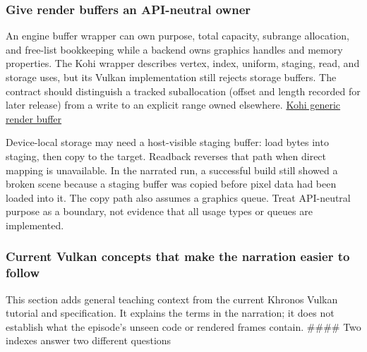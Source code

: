 \subsubsection{Give render buffers an API-neutral owner}\label{06-engine-ii-ch025-give-render-buffers-an-api-neutral-owner}

\hypertarget{06-engine-ii-ch025-give-render-buffers-an-api-neutral-owner}{}

An engine buffer wrapper can own purpose, total capacity, subrange allocation, and free-list bookkeeping while a backend owns graphics handles and memory properties. The Kohi wrapper describes vertex, index, uniform, staging, read, and storage uses, but its Vulkan implementation still rejects storage buffers. The contract should distinguish a tracked suballocation (offset and length recorded for later release) from a write to an explicit range owned elsewhere. \href{https://www.youtube.com/watch?v=7mNgC7dGkZs}{Kohi generic render buffer}

Device-local storage may need a host-visible staging buffer: load bytes into staging, then copy to the target. Readback reverses that path when direct mapping is unavailable. In the narrated run, a successful build still showed a broken scene because a staging buffer was copied before pixel data had been loaded into it. The copy path also assumes a graphics queue. Treat API-neutral purpose as a boundary, not evidence that all usage types or queues are implemented.

\subsubsection{Current Vulkan concepts that make the narration easier to follow}\label{06-engine-ii-ch025-current-vulkan-concepts-that-make-the-narration-easier-to-follow}

\hypertarget{06-engine-ii-ch025-current-vulkan-concepts-that-make-the-narration-easier-to-follow}{}

This section adds general teaching context from the current Khronos Vulkan tutorial and specification. It explains the terms in the narration; it does not establish what the episode's unseen code or rendered frames contain. \#\#\#\# Two indexes answer two different questions

